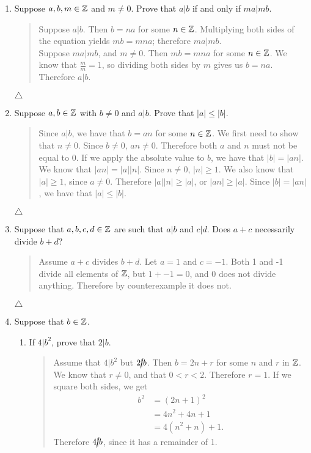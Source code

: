 \documentclass{hw}
\begin{document}
\begin{enumerate}
\item Suppose $a,b,m\in\mathbb{Z}$ and $m\neq 0$. Prove that $a|b$ if and only if $ma|mb$.
\begin{quote}
Suppose $a|b$. Then $b = na$ for some $n\in\mathbb{Z}$. Multiplying both sides of the equation yields
$mb = mna$; therefore $ma|mb$.\\
Suppose $ma|mb$, and $m\neq 0$. Then $mb = mna$ for some $n\in\mathbb{Z}$. We know that $\frac{m}{m} = 1$, so
dividing both sides by $m$ gives us $b = na$. Therefore $a|b$.
\end{quote}
$\triangle$

\item Suppose $a,b\in\mathbb{Z}$ with $b\neq 0$ and $a|b$. Prove that $|a| \leq |b|$.
\begin{quote}
Since $a|b$, we have that $b=an$ for some $n\in\mathbb{Z}$. We first need to show that $n \neq 0$.
Since $b\neq 0$, $an\neq 0$. Therefore both $a$ and $n$ must not be equal to 0. If we apply
the absolute value to $b$, we have that $|b| = |an|$. We know that $|an| = |a||n|$. Since
$n\neq 0$, $|n| \geq 1$. We also know that $|a| \geq 1$, since $a\neq 0$. Therefore
$|a||n| \geq |a|$, or $|an| \geq |a|$. Since $|b| = |an|$, we have that $|a|\leq|b|$.
\end{quote}
$\triangle$

\item Suppose that $a,b,c,d\in\mathbb{Z}$ are such that $a|b$ and $c|d$. Does $a+c$ necessarily
divide $b+d$?
\begin{quote}
Assume $a+c$ divides $b+d$. Let $a=1$ and $c=-1$. Both 1 and -1 divide all elements of $\mathbb{Z}$, but
$1 + -1 = 0$, and 0 does not divide anything. Therefore by counterexample it does not.
\end{quote}
$\triangle$

\item Suppose that $b\in\mathbb{Z}$.
\begin{enumerate}
\item If $4|b^{2}$, prove that $2|b$.
\begin{quote}
Assume that $4|b^{2}$ but $2\cancel{|}b$. Then $b = 2n + r$ for some $n$ and $r$ in $\mathbb{Z}$. We know
that $r\neq 0$, and that $0 < r < 2$. Therefore $r = 1$. If we square both sides, we get
\begin{align*}
b^{2} &= (2n+1)^{2}\\
&= 4n^{2}+4n+1\\
&= 4(n^{2} + n) + 1.
\end{align*}
Therefore $4\cancel{|}b$, since it has a remainder of 1.
\end{quote}

\end{enumerate}
\end{enumerate}
\end{document}
